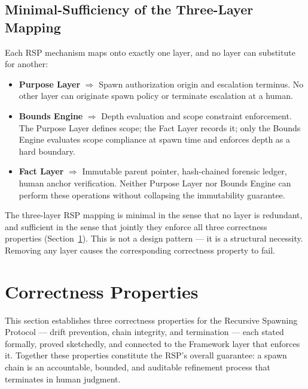 \subsection{Minimal-Sufficiency of the Three-Layer Mapping}
\label{sec:layer-minimal-sufficiency}

Each RSP mechanism maps onto exactly one \bxthree layer, and no layer can substitute for another:

\begin{itemize}
    \itemsep0em
    \item \textbf{Purpose Layer} $\Rightarrow$ Spawn authorization origin and escalation terminus. No other layer can originate spawn policy or terminate escalation at a human.
    \item \textbf{Bounds Engine} $\Rightarrow$ Depth evaluation and scope constraint enforcement. The Purpose Layer defines scope; the Fact Layer records it; only the Bounds Engine evaluates scope compliance at spawn time and enforces depth as a hard boundary.
    \item \textbf{Fact Layer} $\Rightarrow$ Immutable parent pointer, hash-chained forensic ledger, human anchor verification. Neither Purpose Layer nor Bounds Engine can perform these operations without collapsing the immutability guarantee.
\end{itemize}

The three-layer RSP mapping is minimal in the sense that no layer is redundant, and sufficient in the sense that jointly they enforce all three correctness properties (Section~\ref{sec:rs-correctness}). This is not a design pattern — it is a structural necessity. Removing any layer causes the corresponding correctness property to fail.

\section{Correctness Properties}
\label{sec:rs-correctness}

This section establishes three correctness properties for the Recursive Spawning Protocol — drift prevention, chain integrity, and termination — each stated formally, proved sketchedly, and connected to the \bxthree Framework layer that enforces it. Together these properties constitute the RSP's overall guarantee: a spawn chain is an accountable, bounded, and auditable refinement process that terminates in human judgment.

